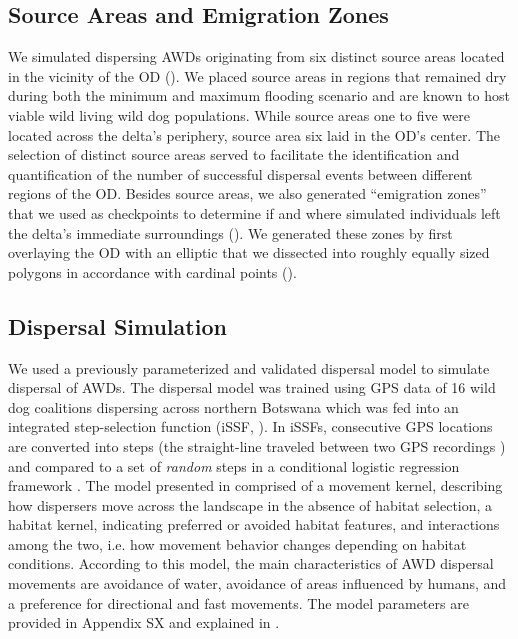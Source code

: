 \documentclass[abstract=on,10pt,a4paper,bibliography=totocnumbered]{article}
\begin{document}
\subsection{Source Areas and Emigration Zones}
We simulated dispersing AWDs originating from six distinct source areas located
in the vicinity of the OD (). We placed source areas in regions
that remained dry during both the minimum and maximum flooding scenario and are
known to host viable wild living wild dog populations. While source areas one to
five were located across the delta's periphery, source area six laid in the OD's
center. The selection of distinct source areas served to facilitate the
identification and quantification of the number of successful dispersal events
between different regions of the OD. Besides source areas, we also generated
``emigration zones'' that we used as checkpoints to determine if and where
simulated individuals left the delta's immediate surroundings
(). We generated these zones by first overlaying the OD with an
elliptic that we dissected into roughly equally sized polygons in accordance
with cardinal points ().

\subsection{Dispersal Simulation}
We used a previously parameterized and validated dispersal model to simulate
dispersal of AWDs. The dispersal model was trained using GPS data of 16 wild dog
coalitions dispersing across northern Botswana \citep{Hofmann.2023} which was
fed into an integrated step-selection function (iSSF, \citealp{Avgar.2016}). In
iSSFs, consecutive GPS locations are converted into steps (the straight-line
traveled between two GPS recordings \citep{Turchin.1998a}) and compared to a set
of \textit{random} steps in a conditional logistic regression framework
\citep{Fortin.2005, Thurfjell.2014, Muff.2020, Fieberg.2021}. The model
presented in \cite{Hofmann.2023} comprised of a movement kernel, describing how
dispersers move across the landscape in the absence of habitat selection, a
habitat kernel, indicating preferred or avoided habitat features, and
interactions among the two, i.e. how movement behavior changes depending on
habitat conditions. According to this model, the main characteristics of AWD
dispersal movements are avoidance of water, avoidance of areas influenced by
humans, and a preference for directional and fast movements. The model
parameters are provided in Appendix SX and explained in \citealp{Hofmann.2023}.
\end{document}
